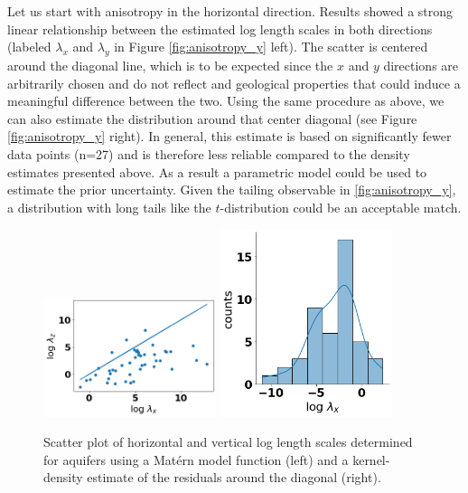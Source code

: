 \documentclass{article}
\begin{document}
Let us start with anisotropy in the horizontal direction. Results showed a strong linear relationship between the estimated log length scales in both directions (labeled $\lambda_x$ and $\lambda_y$ in Figure \ref{fig:anisotropy_y} left). The scatter is centered around the diagonal line, which is to be expected since the $x$ and $y$ directions are arbitrarily chosen and do not reflect and geological properties that could induce a meaningful difference between the two. Using the same procedure as above, we can also estimate the distribution around that center diagonal (see Figure \ref{fig:anisotropy_y} right). In general, this estimate is based on significantly fewer data points (n=27) and is therefore less reliable compared to the density estimates presented above. As a result a parametric model could be used to estimate the prior uncertainty. Given the tailing observable in \ref{fig:anisotropy_y}, a distribution with long tails like the $t$-distribution could be an acceptable match.

\begin{figure}[ht]
    \includegraphics[width=0.45\textwidth]{fig/anisotropy_z_scatter.png}
    \includegraphics[width=0.45\textwidth]{fig/anisotropy_z_kde.png}
    \caption{Scatter plot of horizontal and vertical log length scales determined for aquifers using a Mat{\'e}rn model function (left) and a kernel-density estimate of the residuals around the diagonal (right).}
    \label{fig:anisotropy_z}
\end{figure}
\end{document}
